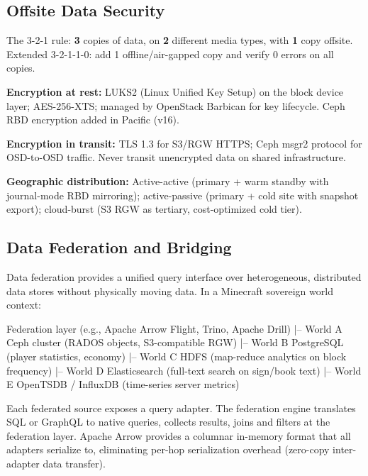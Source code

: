 \documentclass[11pt,letterpaper]{article}
\newenvironment{asciibox}{%
  \begin{tcolorbox}[colback=MidGray!8,colframe=MidGray!40,arc=2pt,left=6pt,right=6pt,top=4pt,bottom=4pt,breakable]
  \ttfamily\small
}{%
  \end{tcolorbox}
}
\begin{document}
\subsection{Offsite Data Security}

The 3-2-1 rule: \textbf{3} copies of data, on \textbf{2} different media types, with \textbf{1} copy offsite. Extended 3-2-1-1-0: add 1 offline/air-gapped copy and verify 0 errors on all copies.

\textbf{Encryption at rest:} LUKS2 (Linux Unified Key Setup) on the block device layer; AES-256-XTS; managed by OpenStack Barbican for key lifecycle. Ceph RBD encryption added in Pacific (v16).

\textbf{Encryption in transit:} TLS 1.3 for S3/RGW HTTPS; Ceph msgr2 protocol for OSD-to-OSD traffic. Never transit unencrypted data on shared infrastructure.

\textbf{Geographic distribution:} Active-active (primary + warm standby with journal-mode RBD mirroring); active-passive (primary + cold site with snapshot export); cloud-burst (S3 RGW as tertiary, cost-optimized cold tier).

\subsection{Data Federation and Bridging}

Data federation provides a unified query interface over heterogeneous, distributed data stores without physically moving data. In a Minecraft sovereign world context:

\begin{asciibox}
Federation layer (e.g., Apache Arrow Flight, Trino, Apache Drill)
  |-- World A Ceph cluster (RADOS objects, S3-compatible RGW)
  |-- World B PostgreSQL (player statistics, economy)
  |-- World C HDFS (map-reduce analytics on block frequency)
  |-- World D Elasticsearch (full-text search on sign/book text)
  |-- World E OpenTSDB / InfluxDB (time-series server metrics)
\end{asciibox}

Each federated source exposes a query adapter. The federation engine translates SQL or GraphQL to native queries, collects results, joins and filters at the federation layer. Apache Arrow provides a columnar in-memory format that all adapters serialize to, eliminating per-hop serialization overhead (zero-copy inter-adapter data transfer).
\end{document}
